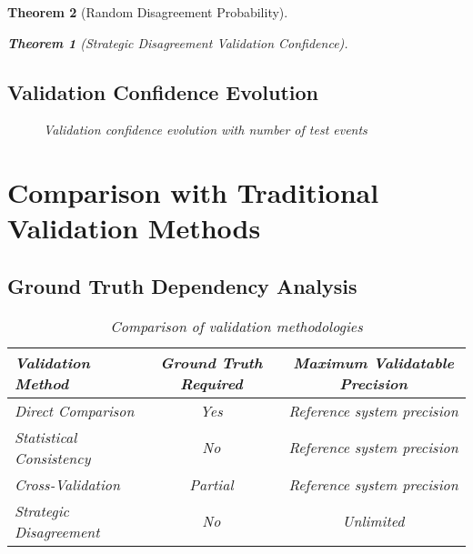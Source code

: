 \documentclass[12pt,a4paper]{article}
\newtheorem{theorem}{Theorem}
\begin{document}
\begin{theorem}[Random Disagreement Probability]
\begin{theorem}[Strategic Disagreement Validation Confidence]
\subsection{Validation Confidence Evolution}

\begin{figure}[H]
\centering
{}
\caption{Validation confidence evolution with number of test events}
\label{fig:confidence_evolution}
\end{figure}

\section{Comparison with Traditional Validation Methods}

\subsection{Ground Truth Dependency Analysis}

\begin{table}[H]
\centering
\begin{tabular}{lcc}
\toprule
\textbf{Validation Method} & \textbf{Ground Truth Required} & \textbf{Maximum Validatable Precision} \\
\midrule
Direct Comparison & Yes & Reference system precision \\
Statistical Consistency & No & Reference system precision \\
Cross-Validation & Partial & Reference system precision \\
Strategic Disagreement & No & Unlimited \\
\bottomrule
\end{tabular}
\caption{Comparison of validation methodologies}
\label{tab:method_comparison}
\end{table}


\end{theorem}
\end{theorem}
\end{document}
